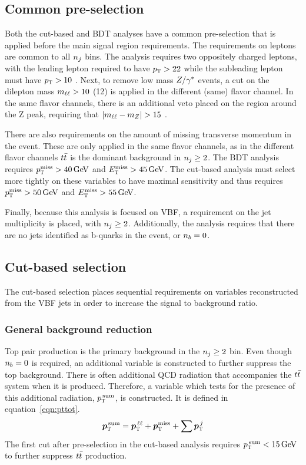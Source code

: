 \subsection{Common pre-selection}
\label{sec:vbf_presel}
Both the cut-based and BDT analyses have a common pre-selection that is applied before the main signal region requirements. The requirements on leptons are common to all $n_j$ bins. The analysis requires two oppositely charged leptons, with the leading lepton required to have $p_{\textrm{\footnotesize\sc t}} > 22$ \GeV while the subleading lepton must have $p_{\textrm{\footnotesize\sc t}} > 10$ \GeV. Next, to remove low mass $Z/\gamma^{\ast}$ events, a cut on the dilepton mass $m_{\ell\ell} > 10$ (12) \GeV is applied in the different (same) flavor channel. In the same flavor channels, there is an additional veto placed on the region around the Z peak, requiring that $|m_{\ell\ell} - m_Z| > 15$ \GeV. 

There are also requirements on the amount of missing transverse momentum in the event. These are only applied in the same flavor channels, as in the different flavor channels $t\bar{t}$ is the dominant background in $n_j \geq 2$. The BDT analysis requires $\MPTj > 40 \GeV$ and $\MET > 45 \GeV$. The cut-based analysis must select more tightly on these variables to have maximal sensitivity and thus requires $\MPTj > 50 \GeV$ and $\MET > 55 \GeV$. 

Finally, because this analysis is focused on VBF, a requirement on the jet multiplicity is placed, with $n_j \geq 2$. Additionally, the analysis requires that there are no jets identified as b-quarks in the event, or $n_b = 0$. 

\subsection{Cut-based selection}

The cut-based selection places sequential requirements on variables reconstructed from the VBF jets in order to increase the signal to background ratio.

\subsubsection{General background reduction}

Top pair production is the primary background in the $n_j \geq 2$ bin. Even though $n_b = 0$ is required, an additional variable is constructed to further suppress the top background. There is often additional QCD radiation that accompanies the $t\bar{t}$ system when it is produced. Therefore, a variable which tests for the presence of this additional radiation, $p_{\textrm{\footnotesize\sc t}}^{\,\rm sum}$, is constructed. It is defined in equation~\ref{eqn:pttot}.
%
\begin{equation}
\hbox{\bm{$p$}}_{\textrm{\footnotesize\sc t}}^{\,\rm sum} = \hbox{\bm{$p$}}_{\textrm{\footnotesize\sc t}}^{\,\ell\ell} + \hbox{\bm{$p$}}_{\textrm{\footnotesize\sc t}}^{\rm miss} + \sum \hbox{\bm{$p$}}_{\textrm{\footnotesize\sc t}}^{\,j}
\label{eqn:pttot}
\end{equation} 
%
The first cut after pre-selection in the cut-based analysis requires $\pTtot < 15 \GeV$ to further suppress $t\bar{t}$ production.  

